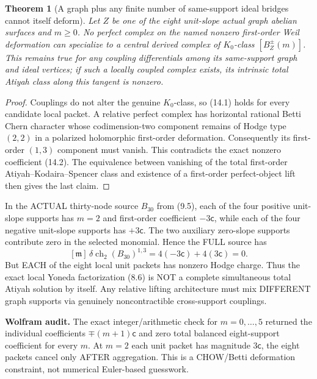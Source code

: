 \documentclass[11pt,a4paper]{article}
\newcommand{\ch}{\operatorname{ch}}
\newtheorem{theorem}{Theorem}[section]
\begin{document}
\begin{theorem}[A graph plus any finite number of same-support ideal bridges cannot itself deform]
Let \(Z\) be one
of the eight
unit-slope actual
graph abelian
surfaces and
\(m\ge0\).
No perfect
complex on the
named nonzero
first-order
Weil deformation
can specialize to
a central derived
complex of
\(K_0\)-class
\([B_Z^\pm(m)]\).
This remains true
for any coupling
differentials
among its same-support
graph and ideal
vertices; if such
a locally coupled
complex exists,
its intrinsic
total Atiyah class
along this tangent
is nonzero.
\end{theorem}
\begin{proof}
Couplings do not
alter the genuine
\(K_0\)-class,
so (14.1) holds
for every
candidate local
packet.
A relative
perfect complex
has horizontal
rational Betti
Chern character
whose codimension-two
component remains
of Hodge type
\((2,2)\) in
a polarized
holomorphic
first-order
deformation.
Consequently
its first-order
\((1,3)\)
component must vanish.
This contradicts
the exact
nonzero coefficient
(14.2).
The equivalence
between vanishing
of the total
first-order
Atiyah--Kodaira--Spencer
class and existence
of a first-order
perfect-object
lift then gives
the last claim.
\end{proof}

\begin{corollary}
In the ACTUAL
thirty-node source
\(B_{30}\) from (9.5),
each of the four
positive unit-slope
supports has
\(m=2\) and
first-order coefficient
\(-3\mathsf c\),
while each of
the four
negative unit-slope
supports has
\(+3\mathsf c\).
The two auxiliary
zero-slope
supports contribute
zero in the
selected
monomial.
Hence the FULL
source has
\[
 \boxed{
 [\mathfrak m]\,
 \delta\ch_2(B_{30})^{1,3}
  =4(-3\mathsf c)+
                 4(3\mathsf c)=0.
 }                                                       \tag{14.3}
\]
But EACH of the
eight local unit
packets has
nonzero Hodge charge.
Thus the
exact local
Yoneda
factorization
(8.6)
is NOT a
complete simultaneous
total Atiyah
solution by
itself.
Any relative
lifting architecture
must mix DIFFERENT
graph supports
via genuinely
noncontractible
cross-support
couplings.
\end{corollary}

\noindent\textbf{Wolfram audit.}
The exact
integer/arithmetic
check for \(m=0,\ldots,5\)
returned the
individual coefficients
\(\mp(m+1)\mathsf c\)
and zero total
balanced eight-support
coefficient
for every \(m\).
At \(m=2\)
each unit packet
has magnitude
\(3\mathsf c\),
the eight packets
cancel only
AFTER aggregation.
This is a
CHOW/Betti
deformation constraint,
not numerical
Euler-based
guesswork.
\end{document}
